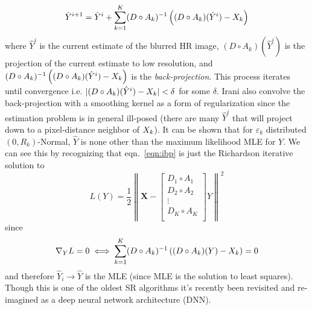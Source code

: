 \begin{equation}
    \hat{Y}^{i+1} = \hat{Y}^i + \sum_{k=1}^K (D \circ A_k)^{-1}\left( (D \circ A_k)(\hat{Y}^i) - \Xk \right)
    \label{eqn:ibp}
\end{equation}
where $\hat{Y}^i$ is the current estimate of the blurred HR image, $(D \circ A_k)(\hat{Y}^i)$ is the projection of the current estimate to low resolution, and $(D \circ A_k)^{-1}\left( (D \circ A_k)(\hat{Y}^i) - X_k \right)$ is the \textit{back-projection}.
%
This process iterates until convergence i.e. $\lvert (D \circ A_k)(\hat{Y}^i) - X_k \rvert < \delta$ for some $\delta$.
%
Irani \etal\cite{Irani1991ImprovingRB} also convolve the back-projection with a smoothing kernel as a form of regularization since the estimation problem is in general ill-posed (there are many $\hat{Y}^{i}$ that will project down to a pixel-distance neighbor of $X_k$).
%
It can be shown\cite{Elad1996} that for $\varepsilon_k$ distributed $(0, R_k)$-Normal, $\hat{Y}$ is none other than the maximum likelihood MLE for $Y$.
%
We can see this by recognizing that eqn.~\eqref{eqn:ibp} is just the Richardson iterative\cite{Anderssen:1972:RNM:891962} solution to
\begin{equation}
    L(Y) = \frac{1}{2} \left\| \bm{X} -  \begin{bmatrix}
                                             D_1 \circ A_1 \\
                                             D_2 \circ A_2 \\
                                             \vdots \\
                                             D_K \circ A_K \\
    \end{bmatrix}  Y  \right\|^2
    \label{eqn:l2regression}
\end{equation}
since
\begin{equation*}
    \nabla_{Y} L = 0
    \iff
    \sum_{k=1}^K (D \circ A_k)^{-1}\left( (D \circ A_k)(Y) - X_k \right) = 0
\end{equation*}
and therefore $\hat{Y}_i \rightarrow \hat{Y}$ is the MLE (since MLE is the solution to least squares\cite{CaseBerg:01}).
%
Though this is one of the oldest SR algorithms it's recently been revisited and re-imagined as a deep neural network architecture (DNN)\cite{DBLP:journals.corr.abs-1803-02735}.
